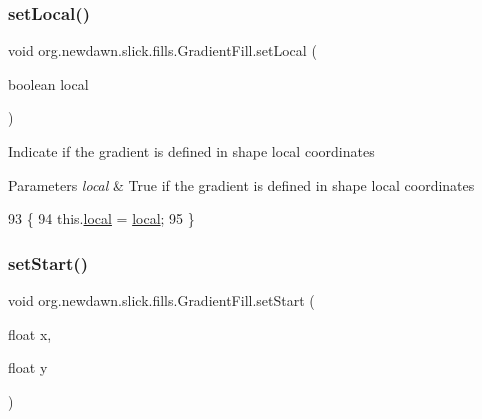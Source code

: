 \subsubsection{\texorpdfstring{set\+Local()}{setLocal()}}
{\footnotesize\ttfamily void org.\+newdawn.\+slick.\+fills.\+Gradient\+Fill.\+set\+Local (\begin{DoxyParamCaption}\item[{boolean}]{local }\end{DoxyParamCaption})\hspace{0.3cm}{\ttfamily [inline]}}

Indicate if the gradient is defined in shape local coordinates


\begin{DoxyParams}{Parameters}
{\em local} & True if the gradient is defined in shape local coordinates \\
\hline
\end{DoxyParams}

\begin{DoxyCode}
93                                         \{
94         this.\mbox{\hyperlink{classorg_1_1newdawn_1_1slick_1_1fills_1_1_gradient_fill_a7a4a465395d82931471d74116cfb9b3b}{local}} = \mbox{\hyperlink{classorg_1_1newdawn_1_1slick_1_1fills_1_1_gradient_fill_a7a4a465395d82931471d74116cfb9b3b}{local}};
95     \}
\end{DoxyCode}
\mbox{\label{classorg_1_1newdawn_1_1slick_1_1fills_1_1_gradient_fill_af1e31068e19c4694dc6db73af7576246}} 
\subsubsection{\texorpdfstring{set\+Start()}{setStart()}\hspace{0.1cm}{\footnotesize\ttfamily [1/2]}}
{\footnotesize\ttfamily void org.\+newdawn.\+slick.\+fills.\+Gradient\+Fill.\+set\+Start (\begin{DoxyParamCaption}\item[{float}]{x,  }\item[{float}]{y }\end{DoxyParamCaption})\hspace{0.3cm}{\ttfamily [inline]}}

